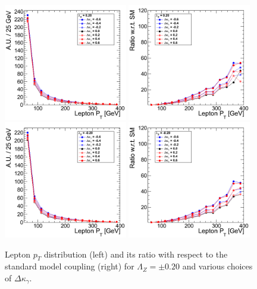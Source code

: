 \begin{figure}[h!t]
  {\centering
    \includegraphics[width=0.48\textwidth]{figs/LeptonpT_020.png}
    \includegraphics[width=0.48\textwidth]{figs/LeptonpT_020_ratio.png}
    \includegraphics[width=0.48\textwidth]{figs/LeptonpT_m020.png}
    \includegraphics[width=0.48\textwidth]{figs/LeptonpT_m020_ratio.png}
    \caption{Lepton $p_T$ distribution (left) and its ratio with respect to 
    the standard model coupling (right) for $\Lambda_Z = \pm 0.20$ and various choices of $\Delta{\kappa_\gamma}$.}
    \label{fig:ww_LeptonpT_atgcRatio020}}
\end{figure}
